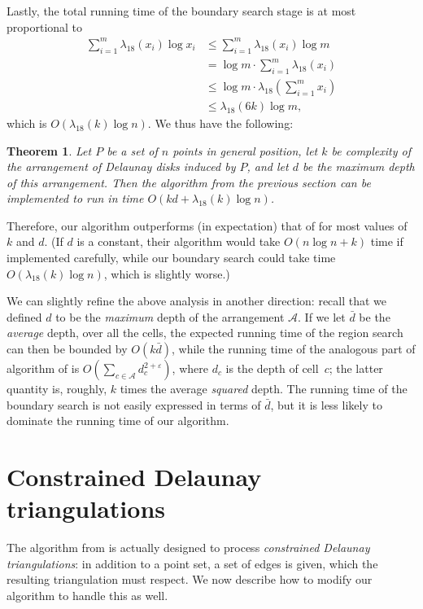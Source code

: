 \documentclass{cccg13}
\newtheorem{theorem}{Theorem}
\newcommand\arr{\mathcal A}
\let\eps\varepsilon
\begin{document}
Lastly, the total running time of the boundary search stage is at most proportional to
\begin{align*}
\textstyle\sum_{i=1}^m \lambda_{18}(x_i)\log x_i&\le
\textstyle\sum_{i=1}^m \lambda_{18}(x_i)\log m\\&=
\textstyle\log m \cdot \sum_{i=1}^m \lambda_{18}(x_i)\\&\le
\textstyle\log m\cdot\lambda_{18}(\sum_{i=1}^m x_i)\\&\le
\lambda_{18}(6k)\log m,
\end{align*}
which is $O(\lambda_{18}(k)\log n)$.  We thus have the following:
\begin{theorem} Let $P$ be a set of $n$ points in general position, let $k$ be complexity of the arrangement of Delaunay disks induced by $P$, and let $d$ be the maximum depth of this arrangement.  Then the algorithm from the previous section can be implemented to run in time $O(kd + \lambda_{18}(k)\log n)$.
\end{theorem}
Therefore, our algorithm outperforms (in expectation) that of \cite{orig} for most values of $k$ and $d$.  (If $d$ is a constant, their algorithm would take $O(n\log n + k)$ time if implemented carefully, while our boundary search could take time $O(\lambda_{18}(k)\log n)$, which is slightly worse.)

We can slightly refine the above analysis in another direction: recall that we defined $d$ to be the \emph{maximum} depth of the arrangement $\arr$.  If we let $\bar d$ be the \emph{average} depth, over all the cells, the expected running time of the region search can then be bounded by
$O(k\bar d)$, while the running time of the analogous part of algorithm of \cite{orig} is $O(\sum_{c\in\arr} d_c^{2+\eps})$, where $d_c$ is the depth of cell~$c$; the latter quantity is, roughly, $k$ times the average \emph{squared} depth.  The running time of the boundary search is not easily expressed in terms of $\bar d$, but it is less likely to dominate the running time of our algorithm.

\section{Constrained Delaunay triangulations}\label{sec:cdt}
The algorithm from \cite{orig} is actually designed to process
\emph{constrained Delaunay triangulations}: in addition to a point
set, a set of edges is given, which the resulting triangulation must respect.
We now describe how to modify our algorithm to handle this as well.
\end{document}
